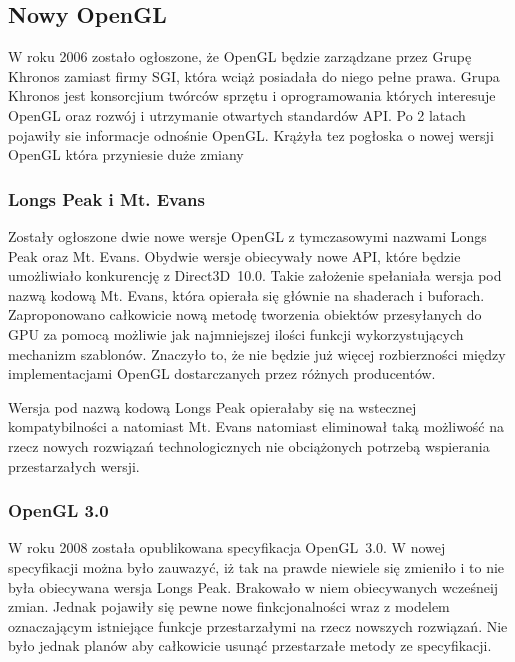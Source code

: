 \subsection{Nowy OpenGL}
\thispagestyle{empty}
\par\indent

W roku 2006 zostało ogłoszone, że OpenGL będzie zarządzane przez Grupę Khronos zamiast firmy SGI, która wciąż posiadała do niego pełne prawa. Grupa Khronos jest konsorcjium twórców sprzętu i oprogramowania których interesuje OpenGL oraz rozwój i utrzymanie otwartych standardów API. Po 2 latach pojawiły sie informacje odnośnie OpenGL. Krążyła tez pogłoska o nowej wersji OpenGL która przyniesie duże zmiany

\subsubsection{Longs Peak i Mt. Evans}
\thispagestyle{empty}
\par\indent

Zostały ogłoszone dwie nowe wersje OpenGL z tymczasowymi nazwami Longs Peak oraz Mt. Evans. Obydwie wersje obiecywały nowe API, które będzie umożliwiało konkurencję z Direct3D~10.0. Takie założenie spełaniała wersja pod nazwą kodową Mt. Evans, która opierała się głównie na shaderach i buforach. Zaproponowano całkowicie nową metodę tworzenia obiektów przesyłanych do GPU za pomocą możliwie jak najmniejszej ilości funkcji wykorzystujących mechanizm szablonów. Znaczyło to, że nie będzie już więcej rozbierzności między implementacjami OpenGL dostarczanych przez różnych producentów.

Wersja pod nazwą kodową Longs Peak opierałaby się na wstecznej kompatybilności a natomiast Mt. Evans natomiast eliminował taką możliwość na rzecz nowych rozwiązań technologicznych nie obciążonych potrzebą wspierania przestarzałych wersji.

\subsubsection{OpenGL 3.0}
\thispagestyle{empty}
\par\indent

W roku 2008 została opublikowana specyfikacja OpenGL~3.0. W nowej specyfikacji można było zauwazyć, iż tak na prawde niewiele się zmieniło i to nie była obiecywana wersja Longs Peak. Brakowało w niem obiecywanych wcześneij zmian. Jednak pojawiły się pewne nowe finkcjonalności wraz z modelem oznaczającym istniejące funkcje przestarzałymi na rzecz nowszych rozwiązań. Nie było jednak planów aby całkowicie usunąć przestarzałe metody ze specyfikacji.

